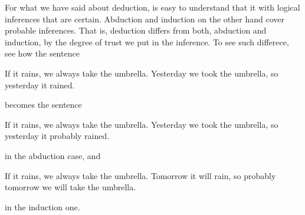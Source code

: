\documentclass{subfiles}
\begin{document}
    For what we have said about deduction, is easy to understand
        that it with logical inferences that are certain.
        Abduction and induction on the other hand cover probable inferences.
        That is, deduction differs from both, abduction and induction,
        by the degree of trust we put in the inference.
        To see such differece, see how the sentence 

        \begin{quote*}
            If it rains, we always take the umbrella. Yesterday we took the umbrella,
            so yesterday it rained.
        \end{quote*}

        \noindent becomes the sentence 

        \begin{quote*}
             If it rains, we always take the umbrella. Yesterday we took the umbrella,
             so yesterday it probably rained.
        \end{quote*}

        \noindent in the abduction case, and 

        \begin{quote*}
             If it rains, we always take the umbrella. Tomorrow it will rain,
             so probably tomorrow we will take the umbrella.
        \end{quote*}

        \noindent in the induction one.
\end{document}
